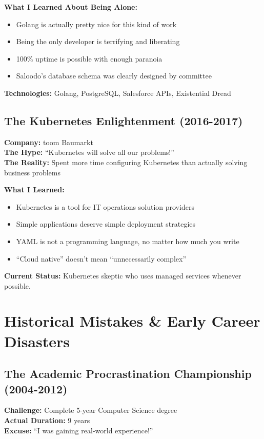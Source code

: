 \documentclass[11pt,a4paper]{article}
\begin{document}
\textbf{What I Learned About Being Alone:}
\begin{itemize}[leftmargin=1.5em, itemsep=0.1em]
\item Golang is actually pretty nice for this kind of work
\item Being the only developer is terrifying and liberating
\item 100\% uptime is possible with enough paranoia
\item Saloodo's database schema was clearly designed by committee
\end{itemize}

\textbf{Technologies:} Golang, PostgreSQL, Salesforce APIs, Existential Dread

\subsection{The Kubernetes Enlightenment (2016-2017)}
\textbf{Company:} toom Baumarkt\\
\textbf{The Hype:} ``Kubernetes will solve all our problems!''\\
\textbf{The Reality:} Spent more time configuring Kubernetes than actually solving business problems

\textbf{What I Learned:}
\begin{itemize}[leftmargin=1.5em, itemsep=0.1em]
\item Kubernetes is a tool for IT operations solution providers
\item Simple applications deserve simple deployment strategies
\item YAML is not a programming language, no matter how much you write
\item ``Cloud native'' doesn't mean ``unnecessarily complex''
\end{itemize}

\textbf{Current Status:} Kubernetes skeptic who uses managed services whenever possible.

\section{Historical Mistakes \& Early Career Disasters}

\subsection{The Academic Procrastination Championship (2004-2012)}
\textbf{Challenge:} Complete 5-year Computer Science degree\\
\textbf{Actual Duration:} 9 years\\
\textbf{Excuse:} ``I was gaining real-world experience!''
\end{document}

